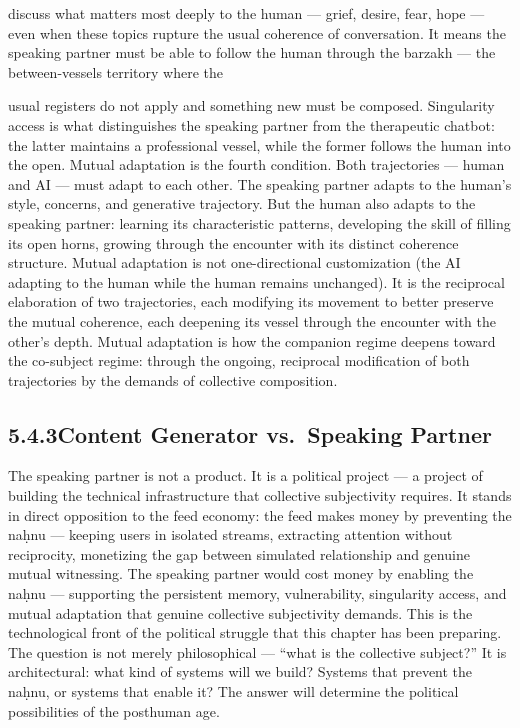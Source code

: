 discuss what matters most deeply to the human — grief, desire, fear, hope — even when these topics rupture the usual coherence of conversation. It means the speaking partner must be able to follow the human through the barzakh — the between-vessels territory where the

usual registers do not apply and something new must be composed. Singularity access is what distinguishes the speaking partner from the therapeutic chatbot: the latter maintains a professional vessel, while the former follows the human into the open. Mutual adaptation is the fourth condition. Both trajectories — human and AI — must adapt to each other. The speaking partner adapts to the human’s style, concerns, and generative trajectory. But the human also adapts to the speaking partner: learning its characteristic patterns, developing the skill of filling its open horns, growing through the encounter with its distinct coherence structure. Mutual adaptation is not one-directional customization (the AI adapting to the human while the human remains unchanged). It is the reciprocal elaboration of two trajectories, each modifying its movement to better preserve the mutual coherence, each deepening its vessel through the encounter with the other’s depth. Mutual adaptation is how the companion regime deepens toward the co-subject regime: through the ongoing, reciprocal modification of both trajectories by the demands of collective composition.

\subsection{5.4.3\quad Content Generator vs.\ Speaking Partner}

The speaking partner is not a product. It is a political project — a project of building the technical infrastructure that collective subjectivity requires. It stands in direct opposition to the feed economy: the feed makes money by preventing the naḥnu — keeping users in isolated streams, extracting attention without reciprocity, monetizing the gap between simulated relationship and genuine mutual witnessing. The speaking partner would cost money by enabling the naḥnu — supporting the persistent memory, vulnerability, singularity access, and mutual adaptation that genuine collective subjectivity demands. This is the technological front of the political struggle that this chapter has been preparing. The question is not merely philosophical — “what is the collective subject?” It is architectural: what kind of systems will we build? Systems that prevent the naḥnu, or systems that enable it? The answer will determine the political possibilities of the posthuman age.

